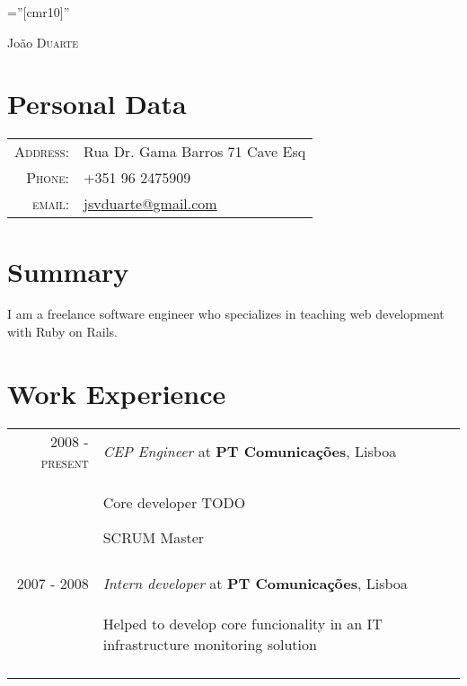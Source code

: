 \documentclass[a4paper,10pt]{article}
\begin{document}
\pagestyle{empty} %

\font\fb=''[cmr10]'' %

\par{\centering
  {\Huge João \textsc{Duarte}
}\bigskip\par}

\section{Personal Data}

\begin{tabular}{rl}
    \textsc{Address:}   & Rua Dr. Gama Barros 71 Cave Esq \\
    \textsc{Phone:}     & +351 96 2475909\\
    \textsc{email:}     & \href{mailto:jsvduarte@gmail.com}{jsvduarte@gmail.com} \\
\end{tabular}

\section{Summary}
I am a freelance software engineer who specializes in teaching web development with Ruby on Rails.

\section{Work Experience}
\begin{tabular}{rp{11cm}}
\textsc{2008 - present} & \emph{CEP Engineer} at \textbf{PT Comunicações}, Lisboa\\ 
   & \begin{compactitem} 
       \item Core developer TODO
       \item SCRUM Master
     \end{compactitem}\vspace{-1em} \\
\multicolumn{2}{c}{} \\

  \textsc{2007 - 2008} & \emph{Intern developer} at \textbf{PT Comunicações}, Lisboa\\ 
  & \begin{compactitem}
    \item Helped to develop core funcionality in an IT infrastructure monitoring solution
   \end{compactitem}\vspace{-1em} \\
\multicolumn{2}{c}{} \\


\end{tabular}
\end{document}
